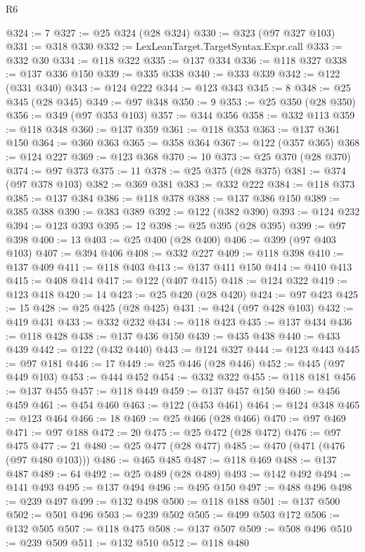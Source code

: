 \begin{lexlean}{R6}
\begin{coremodule}
@324 := 7
@327 := @25 @324 (@28 @324)
@330 := @323 (@97 @327 @103)
@331 := @318 @330
@332 := LexLeanTarget.TargetSyntax.Expr.call
@333 := @332 @30
@334 := @118 @322
@335 := @137 @334
@336 := @118 @327
@338 := @137 @336 @150
@339 := @335 @338
@340 := @333 @339
@342 := @122 (@331 @340)
@343 := @124 @222
@344 := @123 @343
@345 := 8
@348 := @25 @345 (@28 @345)
@349 := @97 @348
@350 := 9
@353 := @25 @350 (@28 @350)
@356 := @349 (@97 @353 @103)
@357 := @344 @356
@358 := @332 @113
@359 := @118 @348
@360 := @137 @359
@361 := @118 @353
@363 := @137 @361 @150
@364 := @360 @363
@365 := @358 @364
@367 := @122 (@357 @365)
@368 := @124 @227
@369 := @123 @368
@370 := 10
@373 := @25 @370 (@28 @370)
@374 := @97 @373
@375 := 11
@378 := @25 @375 (@28 @375)
@381 := @374 (@97 @378 @103)
@382 := @369 @381
@383 := @332 @222
@384 := @118 @373
@385 := @137 @384
@386 := @118 @378
@388 := @137 @386 @150
@389 := @385 @388
@390 := @383 @389
@392 := @122 (@382 @390)
@393 := @124 @232
@394 := @123 @393
@395 := 12
@398 := @25 @395 (@28 @395)
@399 := @97 @398
@400 := 13
@403 := @25 @400 (@28 @400)
@406 := @399 (@97 @403 @103)
@407 := @394 @406
@408 := @332 @227
@409 := @118 @398
@410 := @137 @409
@411 := @118 @403
@413 := @137 @411 @150
@414 := @410 @413
@415 := @408 @414
@417 := @122 (@407 @415)
@418 := @124 @322
@419 := @123 @418
@420 := 14
@423 := @25 @420 (@28 @420)
@424 := @97 @423
@425 := 15
@428 := @25 @425 (@28 @425)
@431 := @424 (@97 @428 @103)
@432 := @419 @431
@433 := @332 @232
@434 := @118 @423
@435 := @137 @434
@436 := @118 @428
@438 := @137 @436 @150
@439 := @435 @438
@440 := @433 @439
@442 := @122 (@432 @440)
@443 := @124 @327
@444 := @123 @443
@445 := @97 @181
@446 := 17
@449 := @25 @446 (@28 @446)
@452 := @445 (@97 @449 @103)
@453 := @444 @452
@454 := @332 @322
@455 := @118 @181
@456 := @137 @455
@457 := @118 @449
@459 := @137 @457 @150
@460 := @456 @459
@461 := @454 @460
@463 := @122 (@453 @461)
@464 := @124 @348
@465 := @123 @464
@466 := 18
@469 := @25 @466 (@28 @466)
@470 := @97 @469
@471 := @97 @188
@472 := 20
@475 := @25 @472 (@28 @472)
@476 := @97 @475
@477 := 21
@480 := @25 @477 (@28 @477)
@485 := @470 (@471 (@476 (@97 @480 @103)))
@486 := @465 @485
@487 := @118 @469
@488 := @137 @487
@489 := 64
@492 := @25 @489 (@28 @489)
@493 := @142 @492
@494 := @141 @493
@495 := @137 @494
@496 := @495 @150
@497 := @488 @496
@498 := @239 @497
@499 := @132 @498
@500 := @118 @188
@501 := @137 @500
@502 := @501 @496
@503 := @239 @502
@505 := @499 @503 @172
@506 := @132 @505
@507 := @118 @475
@508 := @137 @507
@509 := @508 @496
@510 := @239 @509
@511 := @132 @510
@512 := @118 @480

\end{coremodule}
\end{lexlean}
